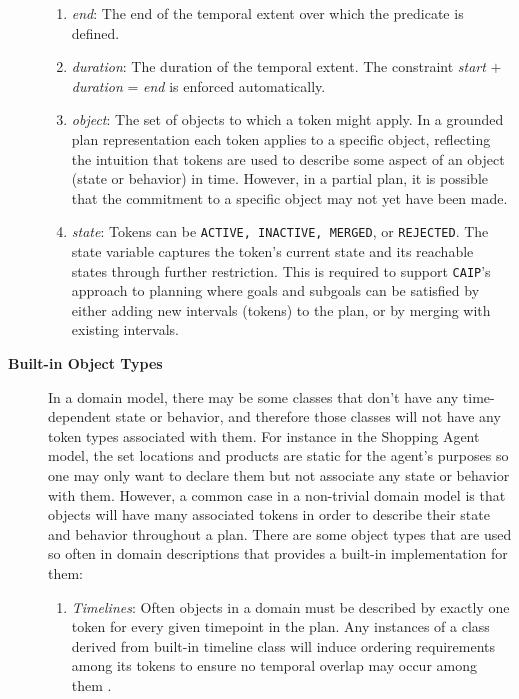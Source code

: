 \begin{description}
\begin{enumerate}
  \item \textit {end}: The end of the temporal extent over which the
    predicate is defined.

  \item \textit {duration}: The duration of the temporal extent. The
    constraint \textit{start} $+$ \textit{duration} = \textit{end} is
    enforced automatically.

  \item \textit{object}: The set of objects to which a token might
    apply. In a grounded plan representation each token applies to a
    specific object, reflecting the intuition that tokens are used to
    describe some aspect of an object (\ie state or behavior) in
    time. However, in a partial plan, it is possible that the
    commitment to a specific object may not yet have been made.

  \item \textit{state}: Tokens can be \texttt{ACTIVE, INACTIVE,
      MERGED}, or \texttt{REJECTED}. The state variable captures the
    token's current state and its reachable states through further
    restriction.  This is required to support \texttt{CAIP}'s approach
    to planning where goals and subgoals can be satisfied by either
    adding new intervals (tokens) to the plan, or by merging with
    existing intervals.
    
  \end{enumerate}

\item[\textbf{Built-in Object Types}] In a domain model, there may be
  some classes that don't have any time-dependent state or behavior,
  and therefore those classes will not have any token types associated
  with them. For instance in the Shopping Agent model, the set
  locations and products are static for the agent's purposes so one
  may only want to declare them but not associate any state or
  behavior with them.  However, a common case in a non-trivial domain
  model is that objects will have many associated tokens in order to
  describe their state and behavior throughout a plan. There are some
  object types that are used so often in domain descriptions that \eu
  provides a built-in implementation for them:

\begin{enumerate}

\item \textit{Timelines}: Often objects in a domain must be described
  by exactly one token for every given timepoint in the plan. Any
  instances of a class derived from \eus built-in timeline class will
  induce ordering requirements among its tokens to ensure no temporal
  overlap may occur among them \cite{mus94}.  


\end{enumerate}
\end{description}
